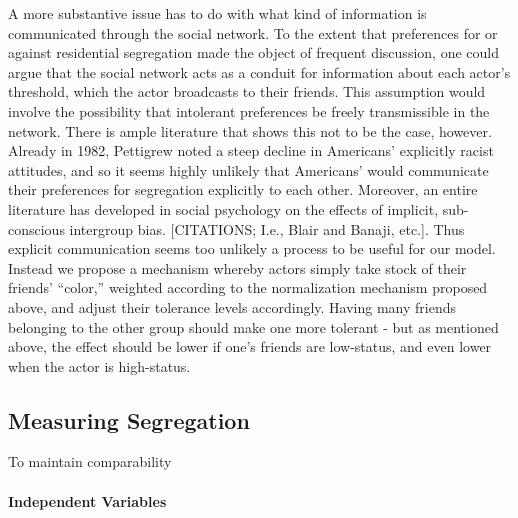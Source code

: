 \documentclass[a4paper,10pt]{article}
\begin{document}
A more substantive issue has to do with what kind of information is communicated through the social network. To the extent that preferences for or against residential segregation made the object of frequent discussion, one could argue that the social network acts as a conduit for information about each actor's threshold, which the actor broadcasts to their friends. This assumption would involve the possibility that intolerant preferences be freely transmissible in the network. There is ample literature that shows this not to be the case, however. Already in 1982, Pettigrew noted a steep decline in Americans' explicitly racist attitudes, and so it seems highly unlikely that Americans' would communicate their preferences for segregation explicitly to each other. Moreover, an entire literature has developed in social psychology on the effects of implicit, sub-conscious intergroup bias. [CITATIONS; I.e., Blair and Banaji, etc.]. Thus explicit communication seems too unlikely a process to be useful for our model. Instead we propose a mechanism whereby actors simply take stock of their friends' ``color,'' weighted according to the normalization mechanism proposed above, and adjust their tolerance levels accordingly. Having many friends belonging to the other group should make one more tolerant - but as mentioned above, the effect should be lower if one's friends are low-status, and even lower when the actor is high-status.

\subsection{Measuring Segregation}

To maintain comparability 

\paragraph{Independent Variables}
\end{document}
